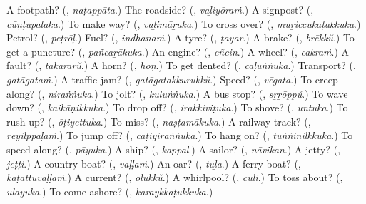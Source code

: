\begin{tcolorbox}[breakable,colback=teal!4,colframe=teal!35!black,title={Before you move on}]
A footpath? (\textbf{}, \emph{naṭappāta}.) The roadside? (\textbf{}, \emph{vaḻiyōraṁ}.) A signpost? (\textbf{}, \emph{cūṇṭupalaka}.) To make way? (\textbf{}, \emph{vaḻimāṟuka}.) To cross over? (\textbf{}, \emph{muṟiccukaṭakkuka}.) Petrol? (\textbf{}, \emph{peṭrōḷ}.) Fuel? (\textbf{}, \emph{indhanaṁ}.) A tyre? (\textbf{}, \emph{ṭayar}.) A brake? (\textbf{}, \emph{brēkkŭ}.) To get a puncture? (\textbf{}, \emph{pañcaṟākuka}.) An engine? (\textbf{}, \emph{eñcin}.) A wheel? (\textbf{}, \emph{cakraṁ}.) A fault? (\textbf{}, \emph{takarāṟŭ}.) A horn? (\textbf{}, \emph{hōṇ}.) To get dented? (\textbf{}, \emph{caḷuṅṅuka}.) Transport? (\textbf{}, \emph{gatāgataṁ}.) A traffic jam? (\textbf{}, \emph{gatāgatakkurukkŭ}.) Speed? (\textbf{}, \emph{vēgata}.) To creep along? (\textbf{}, \emph{niraṅṅuka}.) To jolt? (\textbf{}, \emph{kuluṅṅuka}.) A bus stop? (\textbf{}, \emph{sṟṟōppŭ}.) To wave down? (\textbf{}, \emph{kaikāṇikkuka}.) To drop off? (\textbf{}, \emph{iṟakkiviṭuka}.) To shove? (\textbf{}, \emph{untuka}.) To rush up? (\textbf{}, \emph{ōṭiyettuka}.) To miss? (\textbf{}, \emph{naṣṭamākuka}.) A railway track? (\textbf{}, \emph{ṟeyilppāḷaṁ}.) To jump off? (\textbf{}, \emph{cāṭiyiṟaṅṅuka}.) To hang on? (\textbf{}, \emph{tūṅṅinilkkuka}.) To speed along? (\textbf{}, \emph{pāyuka}.) A ship? (\textbf{}, \emph{kappal}.) A sailor? (\textbf{}, \emph{nāvikan}.) A jetty? (\textbf{}, \emph{jeṭṭi}.) A country boat? (\textbf{}, \emph{vaḷḷaṁ}.) An oar? (\textbf{}, \emph{tuḻa}.) A ferry boat? (\textbf{}, \emph{kaṭattuvaḷḷaṁ}.) A current? (\textbf{}, \emph{oḻukkŭ}.) A whirlpool? (\textbf{}, \emph{cuḻi}.) To toss about? (\textbf{}, \emph{ulayuka}.) To come ashore? (\textbf{}, \emph{karaykkaṭukkuka}.)
\end{tcolorbox}
